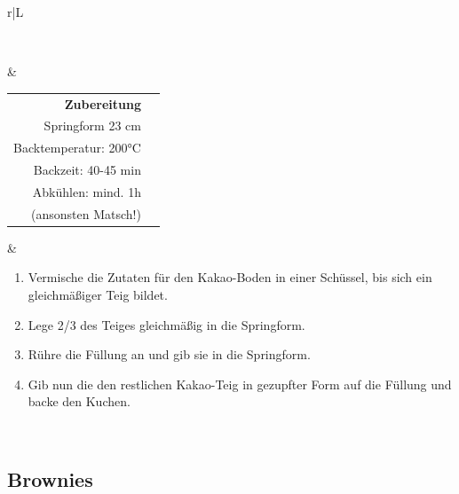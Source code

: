 \documentclass[a4paper, 12pt]{scrbook} 								%
\numberwithin{equation}{section} 									%
\begin{document}
\begin{tabularx}{\textwidth}{r|L}
\begin{tabular}[t]{llll}
										\end{tabular}	\\
									&	\\	
			\begin{tabular}[t]{rr}
				\textbf{Zubereitung}	\\
				Springform 23 cm	\\
				Backtemperatur: 200°C	\\
				Backzeit: 40-45 min	\\
				Abkühlen: mind. 1h \\
				(ansonsten Matsch!)\\
			\end{tabular}			&	\begin{enumerate}[]
											\item Vermische die Zutaten für den Kakao-Boden in einer Schüssel, bis sich ein gleichmäßiger Teig bildet.
											\item Lege 2/3 des Teiges gleichmäßig in die Springform.
											\item Rühre die Füllung an und gib sie in die Springform.
											\item Gib nun die den restlichen Kakao-Teig in gezupfter Form auf die Füllung und backe den Kuchen.
										\end{enumerate}	\\
		\end{tabularx}
		\newpage





		\subsection{Brownies}
\end{document}
